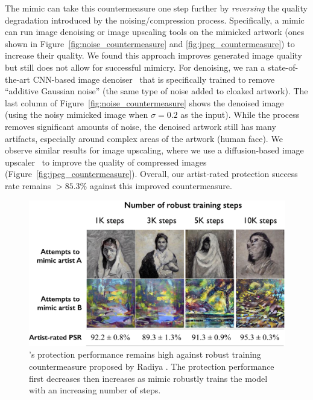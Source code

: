 The mimic can take this countermeasure one step further by \textit{reversing}
the quality degradation introduced by the noising/compression
process. Specifically, a mimic can run image denoising or image upscaling
tools on the mimicked artwork (\eg ones shown in
Figure~\ref{fig:noise_countermeasure} and \ref{fig:jpeg_countermeasure}) to
increase their quality. We found this approach improves generated image
quality but still does not allow for successful mimicry. For denoising, we
ran a state-of-the-art CNN-based image denoiser~\cite{zhang2017beyond} that
is specifically trained to remove ``additive Gaussian noise'' (the same type
of noise added to cloaked artwork). The last column of
Figure~\ref{fig:noise_countermeasure} shows the denoised image (using the
noisy mimicked image when $\sigma=0.2$ as the input). While the process
removes significant amounts of noise, the denoised artwork still has many
artifacts, especially around complex areas of the artwork (\eg human
face). We observe similar results for image upscaling, where we use a
diffusion-based image upscaler~\cite{stable2-1} to improve the quality of
compressed images (Figure~\ref{fig:jpeg_countermeasure}). Overall, our
artist-rated protection success rate remains $> 85.3\%$ against this improved
countermeasure.  

\begin{figure}[t]
  \centering
  \includegraphics[width=1\columnwidth]{plots/counter/florian.pdf}
  \caption{\system{}'s protection performance remains high against robust training countermeasure proposed by Radiya \etal. The protection performance first decreases then increases as mimic robustly trains the model with an increasing number of steps. }
  \label{fig:florian}
\end{figure}

